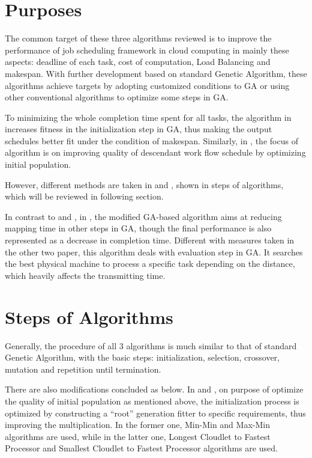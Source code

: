 \documentclass[10pt,twoside,openright,logo]{report}
\begin{document}
\section{Purposes}
The common target of these three algorithms reviewed is to improve the performance of job scheduling framework in cloud computing in mainly these aspects: deadline of each task, cost of computation, Load Balancing and makespan. With further development based on standard Genetic Algorithm, these algorithms achieve targets by adopting customized conditions to GA or using other conventional algorithms to optimize some steps in GA.

To minimizing the whole completion time spent for all tasks, the algorithm in \cite{1} increases fitness in the initialization step in GA, thus making the output schedules better fit under the condition of makespan.
Similarly, in \cite{3}, the focus of algorithm is on improving quality of descendant work flow schedule by optimizing initial population.

However, different methods are taken in \cite{1} and \cite{3}, shown in steps of algorithms, which will be reviewed in following section.

In contrast to \cite{1} and \cite{3}, in \cite{2}, the modified GA-based algorithm aims at reducing mapping time in other steps in GA, though the final performance is also represented as a decrease in completion time. Different with measures taken in the other two paper, this algorithm deals with evaluation step in GA. It searches the best physical machine to process a specific task depending on the distance, which heavily affects the transmitting time.

\section{Steps of Algorithms}
Generally, the procedure of all 3 algorithms is much similar to that of standard Genetic Algorithm, with the basic steps: initialization, selection, crossover, mutation and repetition until termination.

There are also modifications concluded as below.
In \cite{1} and \cite{3}, on purpose of optimize the quality of initial population as mentioned above, the initialization process is optimized by constructing a “root” generation fitter to specific requirements, thus improving the multiplication. In the former one, Min-Min and Max-Min algorithms are used, while in the latter one, Longest Cloudlet to Fastest Processor and Smallest Cloudlet to Fastest Processor algorithms are used.
\end{document}

